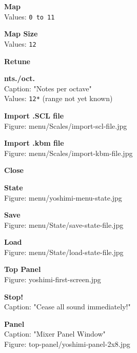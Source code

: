 \documentclass[
 11pt,
 twoside,
 a4paper,
 headinclude,
 footinclude,
 final                                 %
]{article}
\begin{document}
\begin{enumber}
\begin{enumber}
\begin{enumber}
\begin{enumber}
\begin{enumber}
               \item \textbf{Map} \\
                  Values: \texttt{0 to 11}
               \item \textbf{Map Size} \\
                  Values: \texttt{12}
            \end{enumber}
            \item \textbf{Retune}
            \item \textbf{nts./oct.} \\
               Caption: "Notes per octave" \\
               Values: \texttt{12*} (range not yet known)
            \item \textbf{Import .SCL file} \\
               Figure: menu/Scales/import-scl-file.jpg
            \item \textbf{Import .kbm file} \\
               Figure: menu/Scales/import-kbm-file.jpg
            \item \textbf{Close}
         \end{enumber}
      \end{enumber}
      \item \textbf{State} \\
         Figure: menu/yoshimi-menu-state.jpg
      \begin{enumber}
         \item \textbf{Save} \\
            Figure: menu/State/save-state-file.jpg
         \item \textbf{Load} \\
            Figure: menu/State/load-state-file.jpg
      \end{enumber}
   \end{enumber}
   \item \textbf{Top Panel} \\
      Figure: yoshimi-first-screen.jpg
   \begin{enumber}
      \item \textbf{Stop!} \\
         Caption: "Cease all sound immediately!"
      \item \textbf{Panel} \\
         Caption: "Mixer Panel Window" \\
         Figure: top-panel/yoshimi-panel-2x8.jpg
      \begin{enumber}

\end{enumber}
\end{enumber}
\end{enumber}
\end{document}
